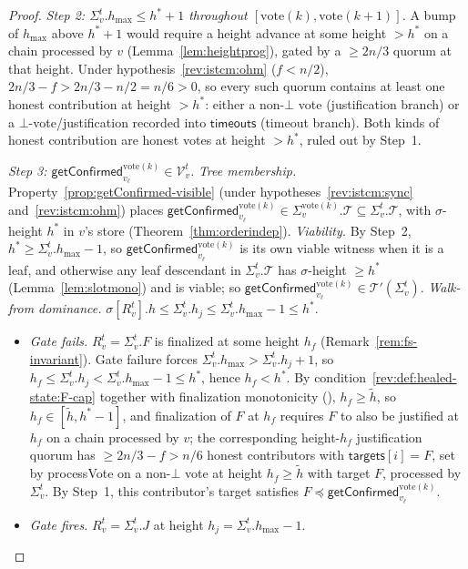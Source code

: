 \documentclass{article}
\newcommand{\T}[0]{\ensuremath{\mathcal{T}}}
\newcommand{\V}[0]{\ensuremath{\mathcal{V}}}
\newcommand{\targets}{\mathsf{targets}}
\newcommand{\timeouts}{\mathsf{timeouts}}
\newcommand{\hmax}{\ensuremath{h_{\max}}\xspace}
\newcommand{\viableTree}{\ensuremath{\mathcal{T}'}}
\newcommand{\processVote}{\textsf{processVote}\xspace}
\newcommand{\vote}{\ensuremath{\mathrm{vote}}}
\newcommand{\comm}[1]{\ensuremath{\widetilde{#1}}}
\newcommand{\getConfirmed}{\textsf{getConfirmed}\xspace}
\theoremstyle{plain}
\theoremstyle{definition}
\theoremstyle{remark}
\begin{document}
\begin{proof}
\emph{Step 2: $\Sigma_v^t.\hmax \leq h^\ast + 1$ throughout $[\vote(k), \vote(k+1)]$.}
A bump of $\hmax$ above $h^\ast + 1$ would require a height advance at some height $> h^\ast$ on a chain processed by $v$ (Lemma~\ref{lem:heightprog}), gated by a $\geq 2n/3$ quorum at that height.
Under hypothesis~\ref{rev:istcm:ohm} ($f < n/2$), $2n/3 - f > 2n/3 - n/2 = n/6 > 0$, so every such quorum contains at least one honest contribution at height $> h^\ast$:
either a non-$\bot$ vote (justification branch) or a $\bot$-vote/justification recorded into $\timeouts$ (timeout branch).
Both kinds of honest contribution are honest votes at height $> h^\ast$, ruled out by Step~1.

\emph{Step 3: $\getConfirmed_{v_\ell}^{\vote(k)} \in \V_v^t$.}
\emph{Tree membership.}
Property~\ref{prop:getConfirmed-visible} (under hypotheses~\ref{rev:istcm:sync} and~\ref{rev:istcm:ohm}) places $\getConfirmed_{v_\ell}^{\vote(k)} \in \Sigma_v^{\vote(k)}.\T \subseteq \Sigma_v^t.\T$, with $\sigma$-height $h^\ast$ in $v$'s store (Theorem~\ref{thm:orderindep}).
\emph{Viability.}
By Step~2, $h^\ast \geq \Sigma_v^t.\hmax - 1$, so $\getConfirmed_{v_\ell}^{\vote(k)}$ is its own viable witness when it is a leaf, and otherwise any leaf descendant in $\Sigma_v^t.\T$ has $\sigma$-height $\geq h^\ast$ (Lemma~\ref{lem:slotmono}) and is viable;
so $\getConfirmed_{v_\ell}^{\vote(k)} \in \viableTree(\Sigma_v^t)$.
\emph{Walk-from dominance.}
$\sigma[R_v^t].h \leq \Sigma_v^t.h_j \leq \Sigma_v^t.\hmax - 1 \leq h^\ast$.
\begin{itemize}
  \item \emph{Gate fails.}
  $R_v^t = \Sigma_v^t.F$ is finalized at some height $h_f$ (Remark~\ref{rem:fs-invariant}).
  Gate failure forces $\Sigma_v^t.\hmax > \Sigma_v^t.h_j + 1$, so $h_f \leq \Sigma_v^t.h_j < \Sigma_v^t.\hmax - 1 \leq h^\ast$, hence $h_f < h^\ast$.
  By condition~\ref{rev:def:healed-state:F-cap} together with finalization monotonicity (), $h_f \geq \comm{h}$, so $h_f \in [\comm{h}, h^\ast - 1]$, and finalization of $F$ at $h_f$ requires $F$ to also be justified at $h_f$ on a chain processed by $v$;
  the corresponding height-$h_f$ justification quorum has $\geq 2n/3 - f > n/6$ honest contributors with $\targets[i] = F$, set by \processVote{} on a non-$\bot$ vote at height $h_f \geq \comm{h}$ with target $F$, processed by $\Sigma_v^t$.
  By Step~1, this contributor's target satisfies $F \preceq \getConfirmed_{v_\ell}^{\vote(k)}$.
  \item \emph{Gate fires.}
  $R_v^t = \Sigma_v^t.J$ at height $h_j = \Sigma_v^t.\hmax - 1$.

\end{itemize}
\end{proof}
\end{document}
